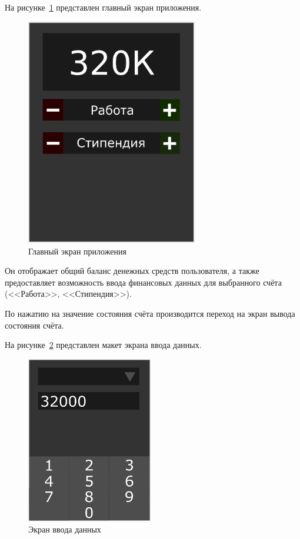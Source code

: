 На рисунке~\ref{fig:screen_main} представлен главный экран приложения.

\begin{figure}[h!]
  \centering
  \includegraphics[width=75mm]{pic/screen_main}
  \caption{Главный экран приложения}
  \label{fig:screen_main}
\end{figure}

Он отображает общий баланс денежных средств пользователя,
а также предоставляет возможность ввода финансовых данных для
выбранного счёта (<<Работа>>, <<Стипендия>>).

По нажатию на значение состояния счёта производится переход на
экран вывода состояния счёта.

На рисунке~\ref{fig:screen_input} представлен макет экрана ввода данных.

\begin{figure}[h!]
  \centering
  \includegraphics[width=55mm]{pic/screen_input}
  \caption{Экран ввода данных}
  \label{fig:screen_input}
\end{figure}

